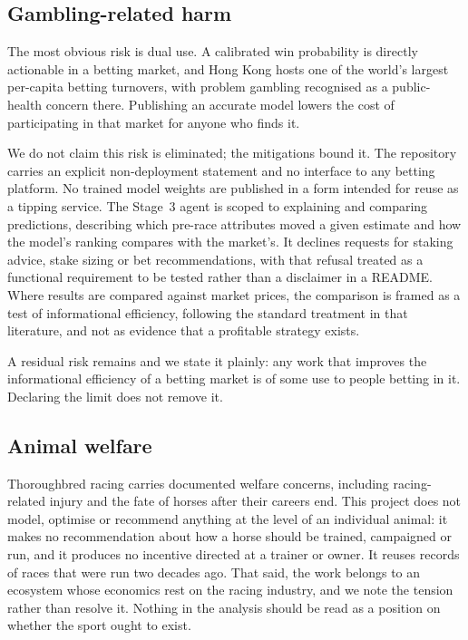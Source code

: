 \subsection{Gambling-related harm}

The most obvious risk is dual use. A calibrated win probability is
directly actionable in a betting market, and Hong Kong hosts one of the
world's largest per-capita betting turnovers, with problem gambling
recognised as a public-health concern there. Publishing an accurate model
lowers the cost of participating in that market for anyone who finds it.

We do not claim this risk is eliminated; the mitigations bound it. The
repository carries an explicit non-deployment statement and no interface
to any betting platform. No trained model weights are published in a form
intended for reuse as a tipping service. The Stage~3 agent is scoped to
explaining and comparing predictions, describing which pre-race
attributes moved a given estimate and how the model's ranking compares
with the market's. It declines requests for staking advice, stake sizing
or bet recommendations, with that refusal treated as a functional
requirement to be tested rather than a disclaimer in a README. Where
results are compared against market prices, the comparison is framed as a
test of informational efficiency, following the standard treatment in that
literature, and not as evidence that a profitable strategy exists.

A residual risk remains and we state it plainly: any work that improves
the informational efficiency of a betting market is of some use to people
betting in it. Declaring the limit does not remove it.

\subsection{Animal welfare}

Thoroughbred racing carries documented welfare concerns, including
racing-related injury and the fate of horses after their careers end.
This project does not model, optimise or recommend anything at the level
of an individual animal: it makes no recommendation about how a horse
should be trained, campaigned or run, and it produces no incentive
directed at a trainer or owner. It reuses records of races that were run
two decades ago. That said, the work belongs to an ecosystem whose
economics rest on the racing industry, and we note the tension rather than
resolve it. Nothing in the analysis should be read as a position on
whether the sport ought to exist.

